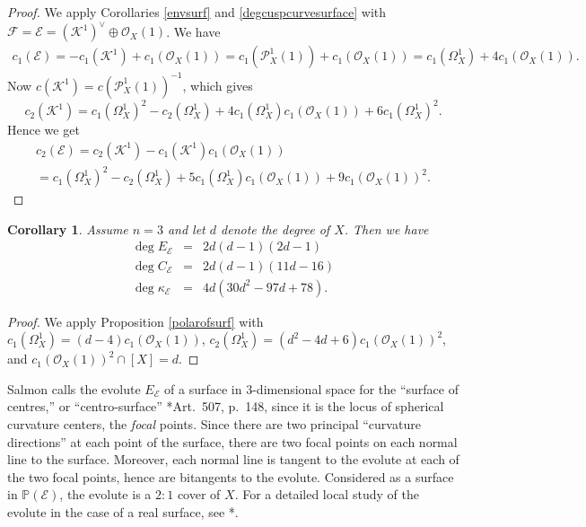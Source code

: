 \documentclass[reqno]{amsart}
\newtheorem{cor}[lemma]{Corollary}
\theoremstyle{definition}
\theoremstyle{remark}
\begin{document}
\begin{proof}
We apply Corollaries \ref{envsurf} and \ref{degcuspcurvesurface} with $\mathcal F=\mathcal E=(\mathcal K^1)^\vee \oplus \mathcal O_X(1)$. We have
\begin{multline*}
c_1(\mathcal E)=-c_1(\mathcal K^1)+c_1(\mathcal O_X(1))=c_1(\mathcal P^1_X(1))+c_1(\mathcal O_X(1))=c_1(\Omega_X^1)+4c_1(\mathcal O_X(1)).
\end{multline*}
Now $c(\mathcal K^1)=c(\mathcal P^1_X(1))^{-1}$, which gives
\[c_2(\mathcal K^1)=c_1(\Omega^1_X)^2-c_2(\Omega_X^1)+4c_1(\Omega_X^1)c_1(\mathcal O_X(1))+6c_1(\Omega_X^1)^2.\]
Hence we get
\begin{multline*}
c_2(\mathcal E)=c_2(\mathcal K^1)-c_1(\mathcal K^1)c_1(\mathcal O_X(1))\\
= c_1(\Omega_X^1)^2-c_2(\Omega_X^1)+5c_1(\Omega_X^1)c_1(\mathcal O_X(1))+9c_1(\mathcal O_X(1))^2.
\end{multline*}
\end{proof}

\begin{cor}
Assume $n=3$ and let $d$ denote the degree of $X$. Then we have
\begin{eqnarray*}
\deg E_\mathcal E &=& 2d(d-1)(2d-1)\\
\deg C_\mathcal E&= &2d(d-1)(11d-16)\\
\deg \kappa_\mathcal E&=& 4d(30d^2-97d+78).
\end{eqnarray*}
\end{cor}

\begin{proof}
We apply Proposition \ref{polarofsurf} with
 $c_1(\Omega^1_X)=(d-4)c_1(\mathcal O_X(1))$, $c_2(\Omega^1_X)=(d^2-4d+6)c_1(\mathcal O_X(1))^2$, and $c_1(\mathcal O_X(1))^2 \cap [X]=d$. 
\end{proof}

Salmon calls the evolute $E_\mathcal E$ of a surface in 3-dimensional space for  the ``surface of centres,'' or ``centro-surface'' \cite{Salmon2}*{Art.~507, p.~148}, since it is the locus of spherical curvature centers, the \emph{focal} points. 
Since there are two principal ``curvature directions'' at each point of the surface, there are two focal points on each normal line to the surface. Moreover, each normal line is tangent to the evolute at each of the two focal points, hence are bitangents to the evolute.
 Considered as a surface in $\mathbb P(\mathcal E)$, the evolute is a $2\colon 1$ cover of $X$. For a detailed local study of the evolute in the case of a real surface, see \cite{P1}*{}.
\end{document}
